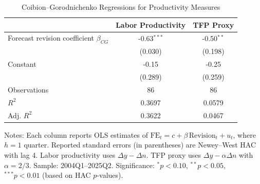 \begin{table}[!t]
    \centering
    \caption{Coibion--Gorodnichenko Regressions for Productivity Measures}
    \label{tab:cg_productivity_h1}
    \begin{threeparttable}
    \begin{tabular}{lcc}
    \toprule
     & Labor Productivity & TFP Proxy \\
    \midrule
    Forecast revision coefficient $\beta_{CG}$ 
    & -0.63$^{***}$ 
    & -0.50$^{**}$ \\
    & (0.030) & (0.198) \\
    Constant 
    & -0.15 
    & -0.25 \\
    & (0.289) & (0.259) \\
    \midrule
    Observations 
    & 86 & 86 \\
    $R^2$ 
    & 0.3697 & 0.0579 \\
    Adj. $R^2$ 
    & 0.3622 & 0.0467 \\
    \bottomrule
    \end{tabular}
    \begin{tablenotes}[flushleft]
    \footnotesize
    \item Notes: Each column reports OLS estimates of
    $\text{FE}_t = c + \beta \,\text{Revision}_t + u_t$, where $h=1$ quarter.
    Reported standard errors (in parentheses) are Newey--West HAC with lag 4.
    Labor productivity uses $\Delta y - \Delta n$.
    TFP proxy uses $\Delta y - \alpha \Delta n$ with $\alpha=2/3$.
    Sample: 2004Q1--2025Q2.
    Significance: $^{*} p<0.10$, $^{**} p<0.05$, $^{***} p<0.01$ (based on HAC $p$-values).
    \end{tablenotes}
    \end{threeparttable}
    \end{table}

